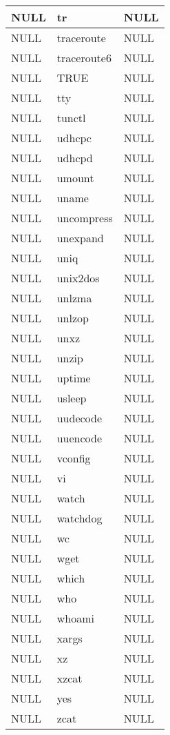 \begin{longtable}{llp{64mm}}
NULL & tr & NULL \\ \hline
NULL & traceroute & NULL \\ \hline
NULL & traceroute6 & NULL \\ \hline
NULL & TRUE & NULL \\ \hline
NULL & tty & NULL \\ \hline
NULL & tunctl & NULL \\ \hline
NULL & udhcpc & NULL \\ \hline
NULL & udhcpd & NULL \\ \hline
NULL & umount & NULL \\ \hline
NULL & uname & NULL \\ \hline
NULL & uncompress & NULL \\ \hline
NULL & unexpand & NULL \\ \hline
NULL & uniq & NULL \\ \hline
NULL & unix2dos & NULL \\ \hline
NULL & unlzma & NULL \\ \hline
NULL & unlzop & NULL \\ \hline
NULL & unxz & NULL \\ \hline
NULL & unzip & NULL \\ \hline
NULL & uptime & NULL \\ \hline
NULL & usleep & NULL \\ \hline
NULL & uudecode & NULL \\ \hline
NULL & uuencode & NULL \\ \hline
NULL & vconfig & NULL \\ \hline
NULL & vi & NULL \\ \hline
NULL & watch & NULL \\ \hline
NULL & watchdog & NULL \\ \hline
NULL & wc & NULL \\ \hline
NULL & wget & NULL \\ \hline
NULL & which & NULL \\ \hline
NULL & who & NULL \\ \hline
NULL & whoami & NULL \\ \hline
NULL & xargs & NULL \\ \hline
NULL & xz & NULL \\ \hline
NULL & xzcat & NULL \\ \hline
NULL & yes & NULL \\ \hline
NULL & zcat & NULL \\ \hline

\end{longtable}

